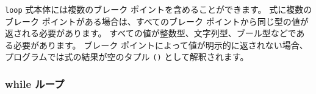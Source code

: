 \texttt{loop} 式本体には複数のブレーク ポイントを含めることができます。 式に複数のブレーク ポイントがある場合は、すべてのブレーク ポイントから同じ型の値が返される必要があります。 すべての値が整数型、文字列型、ブール型などである必要があります。 ブレーク ポイントによって値が明示的に返されない場合、プログラムでは式の結果が空のタプル \texttt{()} として解釈されます。

\subsubsection{while ループ}




\begin{lstlisting}[numbers=none]

\end{lstlisting}


\begin{lstlisting}[numbers=none]

\end{lstlisting}


\begin{lstlisting}[numbers=none]

\end{lstlisting}


\begin{lstlisting}[numbers=none]

\end{lstlisting}


\begin{lstlisting}[numbers=none]

\end{lstlisting}


\begin{lstlisting}[numbers=none]

\end{lstlisting}


\begin{lstlisting}[numbers=none]

\end{lstlisting}


\begin{lstlisting}[numbers=none]

\end{lstlisting}






